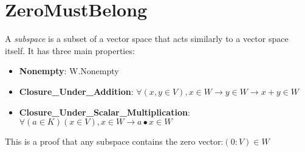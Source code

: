 \section{ZeroMustBelong}


\begin{definition}
  \label{definition : Subspace}
  \leanok
  A \emph{subspace} is a subset of a vector space that acts similarly to a vector space itself. It has three main properties:
  \begin{itemize}
    \item \textbf{Nonempty}:
    W.Nonempty
    \item \textbf{Closure\_Under\_Addition}:
    $\forall (x, y \in V), x ∈ W \rightarrow y \in W \rightarrow x + y \in W$
    \item \textbf{Closure\_Under\_Scalar\_Multiplication}:
    $\forall (a \in K) (x \in V), x \in W \rightarrow a \bullet x \in W$
  \end{itemize}
\end{definition}

\begin{theorem}
  \label{theorem : subspace_contains_zero}
  \leanok
  This is a proof that any subspace contains the zero vector:$(0 : V) \in W$
\end{theorem}
